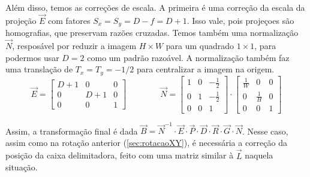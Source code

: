     Além disso, temos as correções de escala. A primeira é uma correção da escala da projeção $\vec{E}$ com fatores $S_x = S_y = D - f = D + 1$. Isso vale, pois projeçoes são homografias, que preservam razões cruzadas. Temos também uma normalização $\vec{N}$, resposável por reduzir a imagem $H \times W$ para um quadrado $1 \times 1$, para podermos usar $D = 2$ como um padrão razoável. A normalização também faz uma translação de $T_x = T_y = -1/2$ para centralizar a imagem na origem.
    \[
        \vec{E} = \begin{bmatrix}
            D + 1 & 0 & 0 \\
            0 & D + 1 & 0 \\
            0 & 0 & 1
        \end{bmatrix}
        \qquad \qquad
        \vec{N} = \begin{bmatrix}
            1 & 0 & -\frac{1}{2} \\
            0 & 1 & -\frac{1}{2} \\
            0 & 0 & 1
        \end{bmatrix} \cdot \begin{bmatrix}
            \frac{1}{W} & 0 & 0 \\
            0 & \frac{1}{H} & 0 \\
            0 & 0 & 1
        \end{bmatrix}
    \]

    Assim, a transformação final é dada $\vec{B} = \vec{N}^{-1} \cdot \vec{E} \cdot \vec{P} \cdot \vec{D} \cdot \vec{R} \cdot \vec{G} \cdot \vec{N}$. Nesse caso, assim como na rotação anterior (\cref{sec:rotacaoXY}), é necessária a correção da posição da caixa delimitadora, feito com uma matriz similar à $\vec{L}$ naquela situação.
